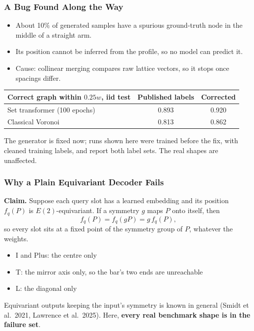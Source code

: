 \begin{frame}[fragile]\frametitle{A Bug Found Along the Way}
\begin{itemize}
\item About 10\% of generated samples have a spurious ground-truth node in the middle of a straight arm.
\item Its position cannot be inferred from the profile, so no model can predict it.
\item Cause: collinear merging compares raw lattice vectors, so it stops once spacings differ.
\end{itemize}

\begin{center}
\small
\begin{tabular}{@{}lcc@{}}
\toprule
\textbf{Correct graph within $0.25w$, iid test} & \textbf{Published labels} & \textbf{Corrected} \\
\midrule
Set transformer (100 epochs) & 0.893 & 0.920 \\
Classical Voronoi & 0.813 & 0.862 \\
\bottomrule
\end{tabular}
\end{center}

{\footnotesize The generator is fixed now; runs shown here were trained before the fix, with cleaned training labels, and report both label sets. The real shapes are unaffected.}
\end{frame}

\begin{frame}[fragile]\frametitle{Why a Plain Equivariant Decoder Fails}
\textbf{Claim.} Suppose each query slot has a learned embedding and its position $f_q(P)$ is $E(2)$-equivariant. If a symmetry $g$ maps $P$ onto itself, then
\[
f_q(P) = f_q(gP) = g\, f_q(P),
\]
so every slot sits at a fixed point of the symmetry group of $P$, whatever the weights.

\begin{itemize}
\item I and Plus: the centre only
\item T: the mirror axis only, so the bar's two ends are unreachable
\item L: the diagonal only
\end{itemize}

\vspace{2pt}
Equivariant outputs keeping the input's symmetry is known in general (Smidt et al.\ 2021, Lawrence et al.\ 2025). Here, \textbf{every real benchmark shape is in the failure set}.
\end{frame}

